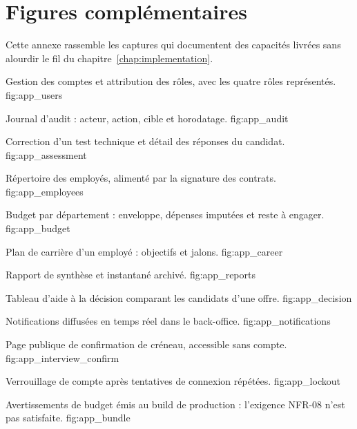 \chapter{Figures complémentaires}
\label{app:figures}

Cette annexe rassemble les captures qui documentent des capacités livrées sans
alourdir le fil du chapitre~\ref{chap:implementation}.

  {Gestion des comptes et attribution des rôles, avec les quatre rôles
   représentés.}
  {fig:app_users}

  {Journal d'audit : acteur, action, cible et horodatage.}
  {fig:app_audit}

  {Correction d'un test technique et détail des réponses du candidat.}
  {fig:app_assessment}

  {Répertoire des employés, alimenté par la signature des contrats.}
  {fig:app_employees}

  {Budget par département : enveloppe, dépenses imputées et reste à engager.}
  {fig:app_budget}

  {Plan de carrière d'un employé : objectifs et jalons.}
  {fig:app_career}

  {Rapport de synthèse et instantané archivé.}
  {fig:app_reports}

  {Tableau d'aide à la décision comparant les candidats d'une offre.}
  {fig:app_decision}

  {Notifications diffusées en temps réel dans le back-office.}
  {fig:app_notifications}

  {Page publique de confirmation de créneau, accessible sans compte.}
  {fig:app_interview_confirm}

  {Verrouillage de compte après tentatives de connexion répétées.}
  {fig:app_lockout}

  {Avertissements de budget émis au build de production : l'exigence NFR-08
   n'est pas satisfaite.}
  {fig:app_bundle}
